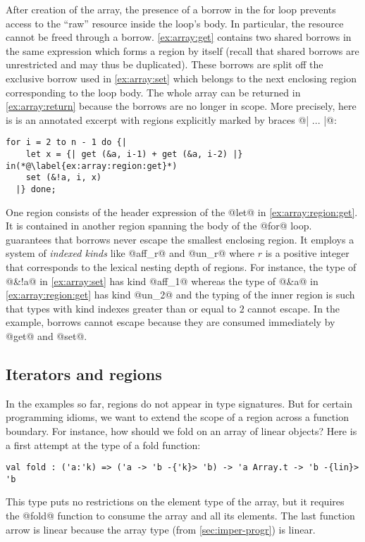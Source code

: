 After
creation of the array, the presence of a borrow in the for loop
prevents access to the ``raw'' resource inside the loop's
body. In particular, the resource cannot be freed through a
borrow. \cref{ex:array:get} contains two shared borrows 
in the same expression which forms a region by itself (recall that
shared borrows are unrestricted and may thus be duplicated). These borrows
are split off the exclusive borrow used in \cref{ex:array:set} which
belongs to the next enclosing region corresponding to the loop body.
The whole array can be returned in \cref{ex:array:return} because  the
borrows are no longer in scope.
%
More precisely, here is is an annotated excerpt with regions explicitly
marked by braces @{| ... |}@:
\begin{lstlisting}[firstnumber=3]
  for i = 2 to n - 1 do {|
    let x = {| get (&a, i-1) + get (&a, i-2) |} in(*@\label{ex:array:region:get}*)
    set (&!a, i, x)
  |} done;
\end{lstlisting}

One region consists of the header expression of the @let@ in
\cref{ex:array:region:get}. It is contained in another region
spanning the body of the @for@ loop. \lang guarantees that borrows
never escape the smallest enclosing region. It employs a system of
\emph{indexed kinds} like @aff_r@ and @un_r@ where
$r$ is a positive integer that corresponds to the lexical nesting
depth of regions. For instance, the type of @&!a@ in
\cref{ex:array:set} has kind @aff_1@ whereas the type of
@&a@ in \cref{ex:array:region:get} has kind
@un_2@ and the typing of the inner region is such that types with
kind indexes greater than or equal to $2$ cannot escape.
In the example, borrows cannot escape  because they are consumed
immediately by @get@ and @set@.



\subsection{Iterators and regions}
\label{tuto:vector}

In the examples so far, regions do not appear in type signatures.
But for certain programming idioms, we want to extend the scope of a
region across a function boundary.
For instance, how should we fold on an array of linear objects?
Here is a first attempt at the type of a fold function:
\begin{lstlisting}[numbers=none]
val fold : ('a:'k) => ('a -> 'b -{'k}> 'b) -> 'a Array.t -> 'b -{lin}> 'b
\end{lstlisting}
This type puts no restrictions on the element type of the array, but
it requires the @fold@ function to consume the array and all its
elements. The last function arrow is linear because the array type (from
\cref{sec:imper-progr}) is linear. 

